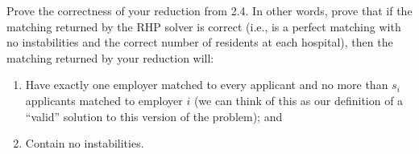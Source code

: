 \begin{questions}
	\question[4] Prove the correctness of your reduction from 2.4. In other words, prove that if the matching returned by the RHP solver is correct (i.e., is a perfect matching with no instabilities and the correct number of residents at each hospital), then the matching returned by your reduction will:
	\begin{enumerate}[label=(\alph*)]
		\item Have exactly one employer matched to every applicant and no more than $s_i$ applicants matched to employer $i$ (we can think of this as our definition of a ``valid'' solution to this version of the problem); and
		\item Contain no instabilities.
	\end{enumerate}
	\ifsolutions\fi

 \end{questions}